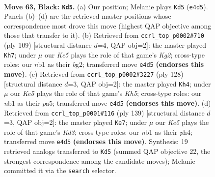 \documentclass[11pt]{article}
\begin{document}
\clearpage

\begin{figure}[p]\centering
\begin{subfigure}{0.46\textwidth}\centering
\resizebox{\linewidth}{!}{%
\newchessgame
\chessboard[
  setfen={7B/8/p7/8/2p1k1b1/8/5K2/1N6 b - - 25 63},
  showmover=false,
  pgfstyle=straightmove, color=movearrow, markmove={e4-d5}
]}
\caption{}
\end{subfigure}\hfill
\begin{subfigure}{0.46\textwidth}\centering
\resizebox{\linewidth}{!}{%
\newchessgame
\chessboard[
  setfen={8/4B1k1/8/4K3/8/6p1/b5B1/8 b - - 6 55},
  showmover=false,
  pgfstyle=straightmove, color=movearrow, markmove={g7-h7}
]}
\caption{}
\end{subfigure}
\\[4pt]
\begin{subfigure}{0.46\textwidth}\centering
\resizebox{\linewidth}{!}{%
\newchessgame
\chessboard[
  setfen={8/8/5k2/p6K/P1B5/8/6P1/2b5 w - - 27 65},
  showmover=false,
  pgfstyle=straightmove, color=movearrow, markmove={h5-h4}
]}
\caption{}
\end{subfigure}\hfill
\begin{subfigure}{0.46\textwidth}\centering
\resizebox{\linewidth}{!}{%
\newchessgame
\chessboard[
  setfen={8/8/3k3p/8/1p2K2P/1B6/1b6/8 b - - 0 70},
  showmover=false,
  pgfstyle=straightmove, color=movearrow, markmove={d6-e7}
]}
\caption{}
\end{subfigure}
\caption{\textbf{Move 63, Black: \texttt{Kd5}.} (a) Our position; Melanie plays \texttt{Kd5} (\texttt{e4d5}). Panels (b)--(d) are the retrieved master positions whose correspondence most drove this move (highest QAP objective among those that transfer to it). (b) Retrieved from \texttt{ccrl\_top\_p0002\#710} (ply 109) [structural distance $d$=4, QAP obj=2]: the master played \texttt{Kh7}; under $\mu$ our \emph{Ke5} plays the role of that game's \emph{Kg2}; cross-type roles: our \emph{n}b1 as their \emph{b}g2; transferred move \texttt{e4d5} \textbf{(endorses this move)}. (c) Retrieved from \texttt{ccrl\_top\_p0002\#3227} (ply 128) [structural distance $d$=3, QAP obj=2]: the master played \texttt{Kh4}; under $\mu$ our \emph{Ke5} plays the role of that game's \emph{Kh5}; cross-type roles: our \emph{n}b1 as their \emph{p}a5; transferred move \texttt{e4d5} \textbf{(endorses this move)}. (d) Retrieved from \texttt{ccrl\_top\_p0001\#116} (ply 139) [structural distance $d$=3, QAP obj=2]: the master played \texttt{Ke7}; under $\mu$ our \emph{Ke5} plays the role of that game's \emph{Kd3}; cross-type roles: our \emph{n}b1 as their \emph{p}h4; transferred move \texttt{e4d5} \textbf{(endorses this move)}. Synthesis: 19 retrieved analogs transferred to \texttt{Kd5} (summed QAP objective 22, the strongest correspondence among the candidate moves); Melanie committed it via the \texttt{search} selector.}
\label{fig:thought-m125}
\end{figure}
\end{document}
